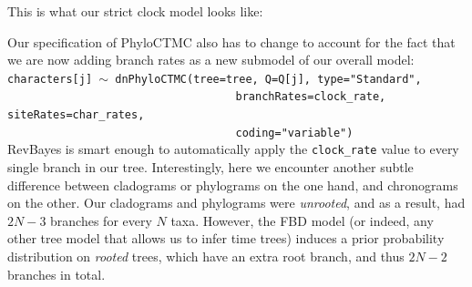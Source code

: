 \documentclass[12pt]{article}
\begin{document}
\noindent This is what our strict clock model looks like: \\

\begin{figure}[h]
\centering
{}
\end{figure}

\noindent Our specification of PhyloCTMC also has to change to account for the fact that we are now adding branch rates as a new submodel of our overall model: \\

\indent \texttt{characters[j] {\footnotesize $\sim$} dnPhyloCTMC(tree=tree, Q=Q[j], type="Standard",} \\
\indent \texttt{\ \ \ \ \ \ \ \ \ \ \ \ \ \ \ \ \ \ \ \ \ \ \ \ \ \ \ \ \ \ \ \ \ \ \ branchRates=clock\_rate, siteRates=char\_rates,} \\
\indent \texttt{\ \ \ \ \ \ \ \ \ \ \ \ \ \ \ \ \ \ \ \ \ \ \ \ \ \ \ \ \ \ \ \ \ \ \ coding="variable")} \\

\noindent RevBayes is smart enough to automatically apply the \texttt{clock\_rate} value to every single branch in our tree. Interestingly, here we encounter another subtle difference between cladograms or phylograms on the one hand, and chronograms on the other. Our cladograms and phylograms were \textit{unrooted}, and as a result, had $2N - 3$ branches for every $N$ taxa. However, the FBD model (or indeed, any other tree model that allows us to infer time trees) induces a prior probability distribution on \textit{rooted} trees, which have an extra root branch, and thus $2N - 2$ branches in total.
\end{document}
